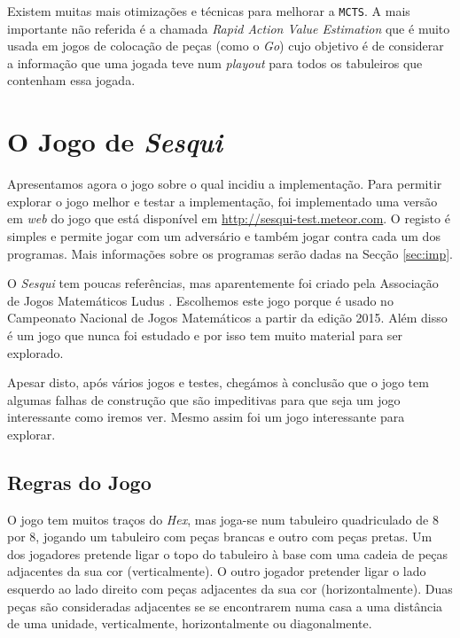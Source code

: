 \documentclass[12pt,a4paper,oneside]{article}
\begin{document}
Existem muitas mais otimizações e técnicas para melhorar a
\texttt{MCTS}. A mais importante não referida é a chamada
\textit{Rapid Action Value Estimation} que é muito usada em jogos de
colocação de peças (como o \textit{Go}) cujo objetivo é de considerar
a informação que uma jogada teve num \textit{playout} para todos os
tabuleiros que contenham essa jogada.



\section{O Jogo de \textit{Sesqui}}
\label{sec:sesqui}

Apresentamos agora o jogo sobre o qual incidiu a implementação. Para
permitir explorar o jogo melhor e testar a implementação, foi
implementado uma versão em \textit{web} do jogo que está disponível em
\url{http://sesqui-test.meteor.com}. O registo é simples e permite
jogar com um adversário e também jogar contra cada um dos
programas. Mais informações sobre os programas serão dadas na Secção
\ref{sec:imp}.

O \textit{Sesqui} tem poucas referências, mas aparentemente foi criado
pela Associação de Jogos Matemáticos Ludus
\cite{Ludus:2014}. Escolhemos este jogo porque é usado no Campeonato
Nacional de Jogos Matemáticos \cite{Ludus:2014b} a partir da edição
2015. Além disso é um jogo que nunca foi estudado e por isso tem muito
material para ser explorado.

Apesar disto, após vários jogos e testes, chegámos à conclusão que o
jogo tem algumas falhas de construção que são impeditivas para que
seja um jogo interessante como iremos ver. Mesmo assim foi um jogo
interessante para explorar.

\subsection{Regras do Jogo}

O jogo tem muitos traços do \textit{Hex}, mas joga-se num tabuleiro
quadriculado de 8 por 8, jogando um tabuleiro com peças brancas e
outro com peças pretas. Um dos jogadores pretende ligar o topo do
tabuleiro à base com uma cadeia de peças adjacentes da sua cor
(verticalmente). O outro jogador pretender ligar o lado esquerdo ao
lado direito com peças adjacentes da sua cor (horizontalmente). Duas
peças são consideradas adjacentes se se encontrarem numa casa a uma
distância de uma unidade, verticalmente, horizontalmente ou
diagonalmente.
\end{document}

